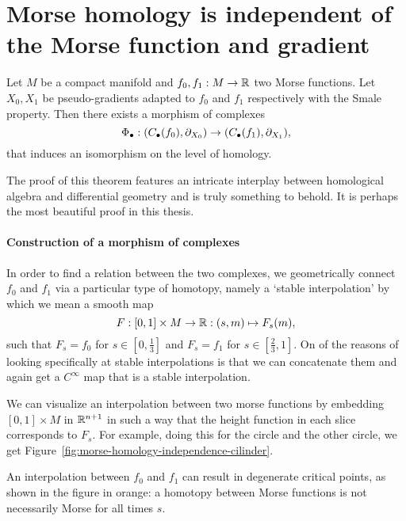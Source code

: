 \section{Morse homology is independent of the Morse function and gradient}
\begin{theorem}
    Let $M$ be a compact manifold and $ f_0, f_1: M \to  \mathbb{R}$ two Morse functions.
    Let $X_0, X_1$ be pseudo-gradients adapted to $f_0$ and $ f_1$ respectively with the Smale property.
    Then there exists a morphism of complexes
    \[
        \Phi_{\bullet}:
        (C_\bullet(f_0), \partial_{X_0}) \to  
        (C_\bullet(f_1), \partial_{X_1})
    ,\] 
    that induces an isomorphism on the level of homology.
\end{theorem}
    
\begin{myproof}
The proof of this theorem features an intricate interplay between homological algebra and differential geometry and is truly something to behold. It is perhaps the most beautiful proof in this thesis.
\paragraph{Construction of a morphism of complexes}
In order to find a relation between the two complexes, we geometrically connect $f_0$ and $f_1$ via a particular type of homotopy, namely  a `stable interpolation' by which we mean a smooth map
\[
    F: [0,1] \times M \to \mathbb{R}: (s, m) \mapsto F_s(m)
,\] 
such that $F_s = f_0$ for $s \in \left[0, \frac{1}{3}\right]$ and $F_s = f_1$ for $s \in \left[\frac{2}{3}, 1\right]$.
On of the reasons of looking specifically at stable interpolations is that we can concatenate them and again get a $C^{\infty}$ map that is a stable interpolation.

We can visualize an interpolation between two morse functions by embedding $[0,1] \times M$ in $\mathbb{R}^{n+1}$ in such a way that the height function in each slice corresponds to $F_s$.
For example, doing this for the circle and the other circle, we get Figure~\ref{fig:morse-homology-independence-cilinder}.

\begin{marginfigure}
    \centering
    \caption{An interpolation between $f_0$ and $f_1$ can result in degenerate critical points, as shown in the figure in orange:
        a homotopy between Morse functions is not necessarily Morse for all times $s$.
    }
    \label{fig:morse-homology-independence-cilinder}
\end{marginfigure}


\end{myproof}
